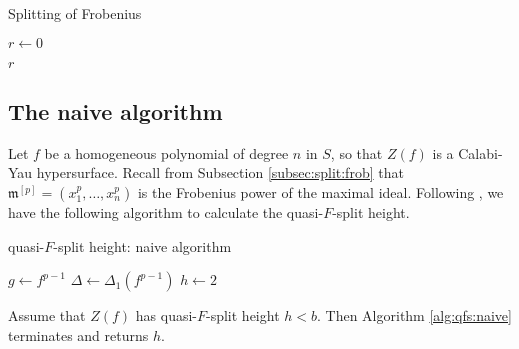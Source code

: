 \begin{algorithm}[H]
\caption{Splitting of Frobenius}
\label{alg:naive:u}

$r \gets 0$\;

\Return $r$
\end{algorithm}

\subsection{The naive algorithm}

Let \(f\) be a homogeneous polynomial of degree \(n\) 
in \(S\), 
so that \(Z(f)\) is a Calabi-Yau hypersurface.
Recall from Subsection \ref{subsec:split:frob} that
\(\mathfrak{m}^{[p]} = (x_{1}^{p}, \ldots, x_{n}^{p})\)
is the Frobenius power of the maximal ideal.
Following \cite{kty-2022-fedder}, we have the following
algorithm to calculate the quasi-\(F\)-split height.

\begin{algorithm}[H]
\caption{quasi-\(F\)-split height: naive algorithm}
\label{alg:qfs:naive}
$g \gets f^{p - 1}$\;
$\Delta \gets \Delta_1(f^{p-1})$\;
$h \gets 2$\;
\end{algorithm}

\begin{thm}
	Assume that
	\(Z(f)\) has quasi-\(F\)-split height \(h < b\).
	Then Algorithm \ref{alg:qfs:naive} terminates
	and returns \(h\).
\end{thm}

